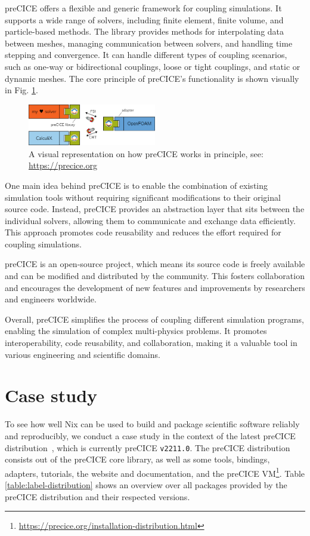 \documentclass{eceasst}
\begin{document}
preCICE offers a flexible and generic framework for coupling simulations.
It supports a wide range of solvers, including finite element, finite volume, and particle-based methods.
The library provides methods for interpolating data between meshes, managing communication between solvers, and handling time stepping and convergence.
It can handle different types of coupling scenarios, such as one-way or bidirectional couplings, loose or tight couplings, and static or dynamic meshes.
The core principle of preCICE's functionality is shown visually in Fig. \ref{fig:precice}.

\begin{figure}
    \centering
    \includegraphics[width=0.5\textwidth]{figures/precice.png}
    \caption{A visual representation on how preCICE works in principle, see: \url{https://precice.org}}
    \label{fig:precice}
\end{figure}

One main idea behind preCICE is to enable the combination of existing simulation tools without requiring significant modifications to their original source code.
Instead, preCICE provides an abstraction layer that sits between the individual solvers, allowing them to communicate and exchange data efficiently.
This approach promotes code reusability and reduces the effort required for coupling simulations.

preCICE is an open-source project, which means its source code is freely available and can be modified and distributed by the community.
This fosters collaboration and encourages the development of new features and improvements by researchers and engineers worldwide.

Overall, preCICE simplifies the process of coupling different simulation programs, enabling the simulation of complex multi-physics problems.
It promotes interoperability, code reusability, and collaboration, making it a valuable tool in various engineering and scientific domains.

\section{Case study}

To see how well Nix can be used to build and package scientific software reliably and reproducibly, we conduct a case study in the context of the latest preCICE distribution~\cite{preciceDistribution}, which is currently preCICE \texttt{v2211.0}.
The preCICE distribution consists out of the preCICE core library, as well as some tools, bindings, adapters, tutorials, the website and documentation, and the preCICE VM\footnote{\url{https://precice.org/installation-distribution.html}}.
Table \ref{table:label-distribution} shows an overview over all packages provided by the preCICE distribution and their respected versions.
\end{document}
